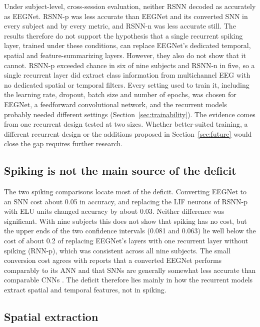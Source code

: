 \documentclass[conference]{IEEEtran}
\begin{document}
Under subject-level, cross-session evaluation, neither RSNN decoded as accurately as EEGNet. RSNN-p was less accurate than EEGNet and its converted SNN in every subject and by every metric, and RSNN-n was less accurate still. The results therefore do not support the hypothesis that a single recurrent spiking layer, trained under these conditions, can replace EEGNet's dedicated temporal, spatial and feature-summarizing layers. However, they also do not show that it cannot. RSNN-p exceeded chance in six of nine subjects and RSNN-n in five, so a single recurrent layer did extract class information from multichannel EEG with no dedicated spatial or temporal filters. Every setting used to train it, including the learning rate, dropout, batch size and number of epochs, was chosen for EEGNet, a feedforward convolutional network, and the recurrent models probably needed different settings (Section~\ref{sec:trainability}). The evidence comes from one recurrent design tested at two sizes. Whether better-suited training, a different recurrent design or the additions proposed in Section~\ref{sec:future} would close the gap requires further research.

\subsection{Spiking is not the main source of the deficit}

The two spiking comparisons locate most of the deficit. Converting EEGNet to an SNN cost about 0.05 in accuracy, and replacing the LIF neurons of RSNN-p with ELU units changed accuracy by about 0.03. Neither difference was significant. With nine subjects this does not show that spiking has no cost, but the upper ends of the two confidence intervals (0.081 and 0.063) lie well below the cost of about 0.2 of replacing EEGNet's layers with one recurrent layer without spiking (RNN-p), which was consistent across all nine subjects. The small conversion cost agrees with reports that a converted EEGNet performs comparably to its ANN \cite{chen2026} and that SNNs are generally somewhat less accurate than comparable CNNs \cite{zhang2025}. The deficit therefore lies mainly in how the recurrent models extract spatial and temporal features, not in spiking.

\subsection{Spatial extraction}
\end{document}
